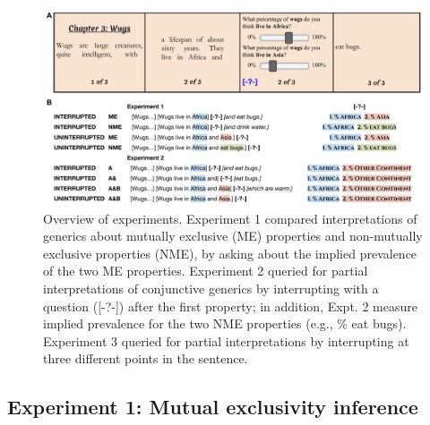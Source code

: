 \documentclass[10pt,letterpaper]{article}
\newcommand{\red}[1]{{\textcolor{Red}{#1}}}
\begin{document}


\begin{figure}[h]
  \centering
    \includegraphics[width=1\textwidth]{design}
  \caption{Overview of experiments. Experiment 1 compared interpretations of generics about mutually exclusive (ME) properties and non-mutually exclusive properties (NME), by asking about the implied prevalence of the two ME properties. Experiment 2 queried for partial interpretations of conjunctive generics by interrupting with a question ([-?-]) after the first property;  in addition, Expt. 2 measure implied prevalence for the two NME properties (e.g., \% eat bugs). Experiment 3 queried for partial interpretations by interrupting at three different points in the sentence. }
  \label{fig:design}
\end{figure}

\subsection{Experiment 1: Mutual exclusivity inference}

\end{document}
